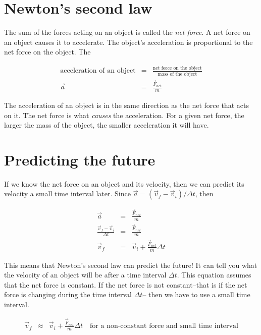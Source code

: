 \section*{Newton's second law}

The sum of the forces acting on an object is called the \emph{net force}. A net force on an object causes it to accelerate. The object's acceleration is proportional to the net force on the object. The 

\begin{eqnarray*}
	\mbox{acceleration of an object} & = & \frac{\mbox{net force on the object}}{\mbox{mass of the object}} \\
	\vec{a} & = & \frac{\vec{F}_{net}}{m}
\end{eqnarray*}

The acceleration of an object is in the same direction as the net force that acts on it. The net force is what \emph{causes} the acceleration. For a given net force, the larger the mass of the object, the smaller acceleration it will have.

\section*{Predicting the future}

If we know the net force on an object and its velocity, then we can predict its velocity a small time interval later. Since $\vec{a}=(\vec{v}_f-\vec{v}_i)/\Delta t$, then

\begin{eqnarray*}
	\vec{a} & = & \frac{\vec{F}_{net}}{m} \\
	\frac{\vec{v}_f - \vec{v}_i}{\Delta t} & = & \frac{\vec{F}_{net}}{m} \\
	\vec{v}_f & = & \vec{v}_i +  \frac{\vec{F}_{net}}{m}\Delta t
\end{eqnarray*}

This means that Newton's second law can predict the future! It can tell you what the velocity of an object will be after a time interval $\Delta t$. This equation assumes that the net force is constant. If the net force is not constant--that is if the net force is changing during the time interval $\Delta t$-- then we have to use a small time interval.

\begin{eqnarray*}
	\vec{v}_f & \approx & \vec{v}_i +  \frac{\vec{F}_{net}}{m}\Delta t \quad \mbox{for a non-constant force and small time interval}
\end{eqnarray*}


